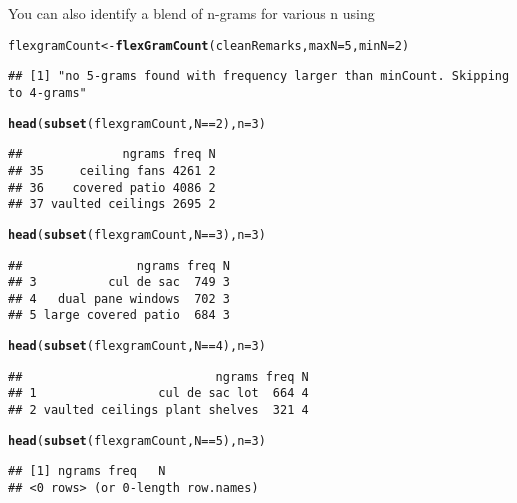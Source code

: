 \documentclass{article}\usepackage[]{graphicx}\usepackage[]{color}
\makeatletter
\newcommand{\hlnum}[1]{\textcolor[rgb]{0.686,0.059,0.569}{#1}}%
\newcommand{\hlopt}[1]{\textcolor[rgb]{0,0,0}{#1}}%
\newcommand{\hlstd}[1]{\textcolor[rgb]{0.345,0.345,0.345}{#1}}%
\newcommand{\hlkwb}[1]{\textcolor[rgb]{0.69,0.353,0.396}{#1}}%
\newcommand{\hlkwc}[1]{\textcolor[rgb]{0.333,0.667,0.333}{#1}}%
\newcommand{\hlkwd}[1]{\textcolor[rgb]{0.737,0.353,0.396}{\textbf{#1}}}%
\newenvironment{kframe}{%
 \def\at@end@of@kframe{}%
 \ifinner\ifhmode%
  \def\at@end@of@kframe{\end{minipage}}%
  \begin{minipage}{\columnwidth}%
 \fi\fi%
 \def\FrameCommand##1{\hskip\@totalleftmargin \hskip-\fboxsep
 \colorbox{shadecolor}{##1}\hskip-\fboxsep
     \hskip-\linewidth \hskip-\@totalleftmargin \hskip\columnwidth}%
 \MakeFramed {\advance\hsize-\width
   \@totalleftmargin\z@ \linewidth\hsize
   \@setminipage}}%
 {\par\unskip\endMakeFramed%
 \at@end@of@kframe}
\newenvironment{knitrout}{}{} %
\makeatother
\begin{document}
You can also identify a blend of n-grams for various n using
\begin{knitrout}\footnotesize
{}\color{fgcolor}\begin{kframe}
\begin{alltt}
\hlstd{flexgramCount} \hlkwb{<-} \hlkwd{flexGramCount}\hlstd{(cleanRemarks ,} \hlkwc{maxN}\hlstd{=}\hlnum{5} \hlstd{,} \hlkwc{minN}\hlstd{=}\hlnum{2}\hlstd{)}
\end{alltt}
\begin{verbatim}
## [1] "no 5-grams found with frequency larger than minCount. Skipping to 4-grams"
\end{verbatim}
\begin{alltt}
\hlkwd{head}\hlstd{(}\hlkwd{subset}\hlstd{(flexgramCount , N}\hlopt{==}\hlnum{2}\hlstd{) ,} \hlkwc{n}\hlstd{=}\hlnum{3}\hlstd{)}
\end{alltt}
\begin{verbatim}
##              ngrams freq N
## 35     ceiling fans 4261 2
## 36    covered patio 4086 2
## 37 vaulted ceilings 2695 2
\end{verbatim}
\begin{alltt}
\hlkwd{head}\hlstd{(}\hlkwd{subset}\hlstd{(flexgramCount , N}\hlopt{==}\hlnum{3}\hlstd{) ,} \hlkwc{n}\hlstd{=}\hlnum{3}\hlstd{)}
\end{alltt}
\begin{verbatim}
##                ngrams freq N
## 3          cul de sac  749 3
## 4   dual pane windows  702 3
## 5 large covered patio  684 3
\end{verbatim}
\begin{alltt}
\hlkwd{head}\hlstd{(}\hlkwd{subset}\hlstd{(flexgramCount , N}\hlopt{==}\hlnum{4}\hlstd{) ,} \hlkwc{n}\hlstd{=}\hlnum{3}\hlstd{)}
\end{alltt}
\begin{verbatim}
##                           ngrams freq N
## 1                 cul de sac lot  664 4
## 2 vaulted ceilings plant shelves  321 4
\end{verbatim}
\begin{alltt}
\hlkwd{head}\hlstd{(}\hlkwd{subset}\hlstd{(flexgramCount , N}\hlopt{==}\hlnum{5}\hlstd{) ,} \hlkwc{n}\hlstd{=}\hlnum{3}\hlstd{)}
\end{alltt}
\begin{verbatim}
## [1] ngrams freq   N     
## <0 rows> (or 0-length row.names)
\end{verbatim}
\end{kframe}
\end{knitrout}
\end{document}
